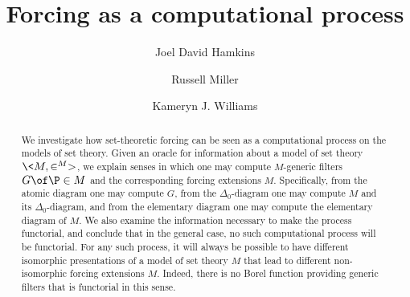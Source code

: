 \documentclass{amsart}
\title{Forcing as a computational process}
\author{Joel David Hamkins}
\author{Russell Miller}
\author{Kameryn J. Williams}
\begin{document}
\begin{abstract}
We investigate how set-theoretic forcing can be seen as a computational process on the models of set theory. Given an oracle for information about a model of set theory $\<M,\in^M>$, we explain senses in which one may compute $M$-generic filters $G\of\P\in M$ and the corresponding forcing extensions $M$. Specifically, from the atomic diagram one may compute $G$, from the $\Delta_0$-diagram one may compute $M$ and its $\Delta_0$-diagram, and from the elementary diagram one may compute the elementary diagram of $M$.
We also examine the information necessary to make the process functorial, and conclude that in the general case, no such computational process will be functorial. For any such process, it will always be possible to have different isomorphic presentations of a model of set theory $M$ that lead to different non-isomorphic forcing extensions $M$. Indeed, there is no Borel function providing generic filters that is functorial in this sense.
\end{abstract}
\maketitle
\end{document}
